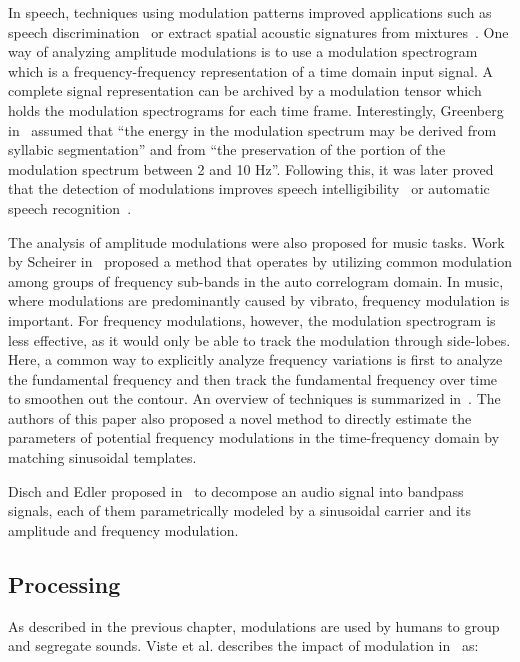 In speech, techniques using modulation patterns improved applications such as speech  discrimination~\cite{mesgarani04} or extract spatial acoustic signatures from mixtures~\cite{sukittanon06}.
One way of analyzing amplitude modulations is to use a modulation spectrogram~\cite{greenberg97} which is a frequency-frequency representation of a time domain input signal.
A complete signal representation can be archived by a modulation tensor which holds the modulation spectrograms for each time frame.
Interestingly, Greenberg in~\cite{greenberg97} assumed that ``the energy in the modulation spectrum may be derived from syllabic segmentation'' and from ``the preservation of the portion of the modulation spectrum between 2 and 10 Hz''.
Following this, it was later proved that the detection of modulations improves speech intelligibility~\cite{elhilali03} or automatic speech recognition~\cite{kingsbury98}.
\par
The analysis of amplitude modulations were also proposed for music tasks. 
Work by Scheirer in~\cite{scheirer99} proposed a method that operates by utilizing common modulation among groups of frequency sub-bands in the auto correlogram domain.
In music, where modulations are predominantly caused by vibrato, frequency modulation is important.
For frequency modulations, however, the modulation spectrogram is less effective, as it would only be able to track the modulation through side-lobes.
Here, a common way to explicitly analyze frequency variations is first to analyze the fundamental frequency and then track the fundamental frequency over time to smoothen out the contour.
An overview of techniques is summarized in~\cite{driedger16}.
The authors of this paper also proposed a novel method to directly estimate the parameters of potential frequency modulations in the time-frequency domain by matching sinusoidal templates.
\par
Disch and Edler proposed in~\cite{disch09} to decompose an audio signal into bandpass signals, each of them parametrically modeled by a sinusoidal carrier and its amplitude and frequency modulation.

\subsection{Processing}

As described in the previous chapter, modulations are used by humans to group and segregate sounds. Viste et al. describes the impact of modulation in~\cite{viste03} as:

